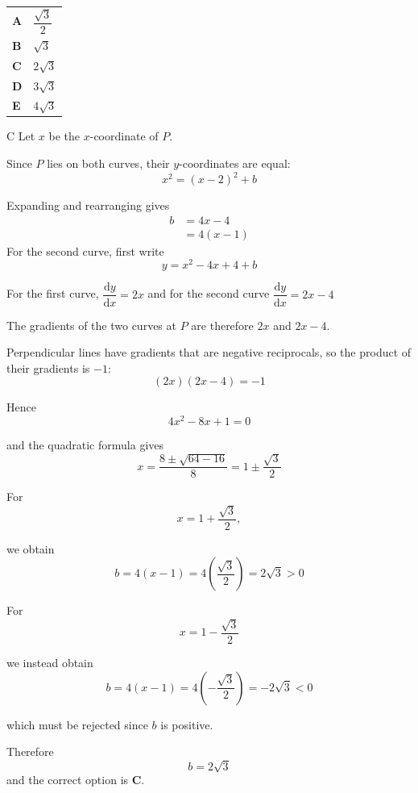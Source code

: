 \documentclass[11pt,a4paper]{article}
\begin{document}
\begin{enumerate}[label=\textbf{\arabic*.},leftmargin=*,itemsep=0pt,start=3]
\par\vspace*{12pt}
\begin{tabularx}{\linewidth}{@{}>{\bfseries}l Y@{}}
A &
$\dfrac{\sqrt{3}}{2}$
\\[0.8em]
B &
$\sqrt{3}$
\\[0.8em]
C &
$2\sqrt{3}$
\\[0.8em]
D &
$3\sqrt{3}$
\\[0.8em]
E &
$4\sqrt{3}$
\\
\end{tabularx}

\begin{djsSolution}{C}
Let $x$ be the $x$-coordinate of $P$. 

Since $P$ lies on both curves, their $y$-coordinates are equal:
\[
x^2=(x-2)^2+b
\]

Expanding and rearranging gives
\begin{align*}
b&=4x-4\\
 &=4(x-1)
\end{align*}
For the second curve, first write
\[
y=x^2-4x+4+b
\]

For the first curve, \( \dfrac{\mathrm{d}y}{\mathrm{d}x} =2x\) and for the second curve \( \dfrac{\mathrm{d}y}{\mathrm{d}x} =2x-4\)

The gradients of the two curves at $P$ are therefore $2x$ and $2x-4$. 

Perpendicular lines have gradients that are negative reciprocals, so the product of their gradients is $-1$:
\[
(2x)(2x-4)=-1
\]

Hence
\[
4x^2-8x+1=0
\]

and the quadratic formula gives
\[
x=\frac{8\pm\sqrt{64-16}}{8}=1\pm\frac{\sqrt{3}}{2}
\]

For
\[
x=1+\frac{\sqrt{3}}{2},
\]

we obtain
\[
b=4(x-1)
=4\left(\frac{\sqrt{3}}{2}\right)
=2\sqrt{3}>0
\]

For
\[
x=1-\frac{\sqrt{3}}{2}
\]

we instead obtain
\[
b=4(x-1)
=4\left(-\frac{\sqrt{3}}{2}\right)
=-2\sqrt{3}<0
\]

which must be rejected since $b$ is positive.

Therefore
\[
b=2\sqrt{3}
\]
and the correct option is \textbf{C}.
\end{djsSolution}
\end{enumerate}
\end{document}
